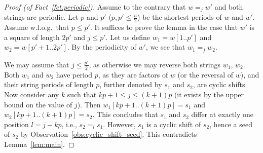 \documentclass{article}
\begin{document}
  \begin{proof}[Proof (of Fact~\ref{fct:periodic})]
    Assume to the contrary that $w =_j w'$ and both strings are periodic.
    Let $p$ and $p'$ ($p,p' \le \frac{n}{2}$) be the shortest periods of $w$ and $w'$.
    Assume w.l.o.g.\ that $p \le p'$.
    It suffices to prove the lemma in the case that $w'$ is a square of length $2p'$ and $j \le p'$.
    Let us define $w_1=w[1..p']$ and $w_2=w[p'+1..2p']$.
    By the periodicity of $w'$, we see that $w_1 =_j w_2$.

    We may assume that $j \le \frac{p'}{2}$, as otherwise we may reverse both strings $w_1$, $w_2$.
    Both $w_1$ and $w_2$ have period $p$, as they are factors of $w$ (or the reversal of $w$), and their string periods of length $p$,
    further denoted by $s_1$ and $s_2$, are cyclic shifts.
    Now consider any $k$ such that $kp+1 \le j \le (k+1)p$ (it exists by the upper bound on the value of $j$).
    Then $w_1[kp+1..(k+1)p]=s_1$ and $w_2[kp+1..(k+1)p]=s_2$.
    This concludes that $s_1$ and $s_2$ differ at exactly one position $l=j-kp$, i.e., $s_2=_l s_1$.
    However, $s_1$ is a cyclic shift of $s_2$, hence a seed of $s_2$ by Observation~\ref{obs:cyclic_shift_seed}.
    This contradicts Lemma~\ref{lem:main}.
  \end{proof}
\end{document}

